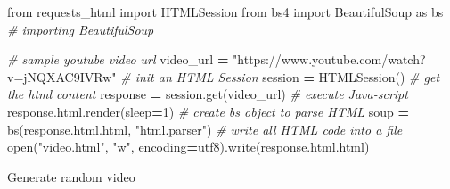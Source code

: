 \documentclass[
]{book}
\newenvironment{Shaded}{\begin{snugshade}}{\end{snugshade}}
\newcommand{\BuiltInTok}[1]{#1}
\newcommand{\CommentTok}[1]{\textcolor[rgb]{0.56,0.35,0.01}{\textit{#1}}}
\newcommand{\DecValTok}[1]{\textcolor[rgb]{0.00,0.00,0.81}{#1}}
\newcommand{\ImportTok}[1]{#1}
\newcommand{\NormalTok}[1]{#1}
\newcommand{\OperatorTok}[1]{\textcolor[rgb]{0.81,0.36,0.00}{\textbf{#1}}}
\newcommand{\StringTok}[1]{\textcolor[rgb]{0.31,0.60,0.02}{#1}}
\begin{document}
\begin{Shaded}
\begin{Highlighting}[]
\ImportTok{from}\NormalTok{ requests\_html }\ImportTok{import}\NormalTok{ HTMLSession }
\ImportTok{from}\NormalTok{ bs4 }\ImportTok{import}\NormalTok{ BeautifulSoup }\ImportTok{as}\NormalTok{ bs }\CommentTok{\# importing BeautifulSoup}

\CommentTok{\# sample youtube video url}
\NormalTok{video\_url }\OperatorTok{=} \StringTok{"https://www.youtube.com/watch?v=jNQXAC9IVRw"}
\CommentTok{\# init an HTML Session}
\NormalTok{session }\OperatorTok{=}\NormalTok{ HTMLSession()}
\CommentTok{\# get the html content}
\NormalTok{response }\OperatorTok{=}\NormalTok{ session.get(video\_url)}
\CommentTok{\# execute Java{-}script}
\NormalTok{response.html.render(sleep}\OperatorTok{=}\DecValTok{1}\NormalTok{)}
\CommentTok{\# create bs object to parse HTML}
\NormalTok{soup }\OperatorTok{=}\NormalTok{ bs(response.html.html, }\StringTok{"html.parser"}\NormalTok{)}
\CommentTok{\# write all HTML code into a file}
\BuiltInTok{open}\NormalTok{(}\StringTok{"video.html"}\NormalTok{, }\StringTok{"w"}\NormalTok{, encoding}\OperatorTok{=}\StringTok{\textquotesingle{}utf8\textquotesingle{}}\NormalTok{).write(response.html.html)}
\end{Highlighting}
\end{Shaded}

Generate random video
\end{document}
